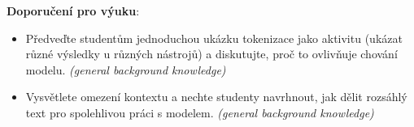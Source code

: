 \noindent\textbf{Doporučení pro výuku}:
\begin{itemize}
  \item Předveďte studentům jednoduchou ukázku tokenizace jako aktivitu (ukázat různé výsledky u různých nástrojů) a diskutujte, proč to ovlivňuje chování modelu. \emph{(general background knowledge)}
  \item Vysvětlete omezení kontextu a nechte studenty navrhnout, jak dělit rozsáhlý text pro spolehlivou práci s modelem. \emph{(general background knowledge)}
\end{itemize}